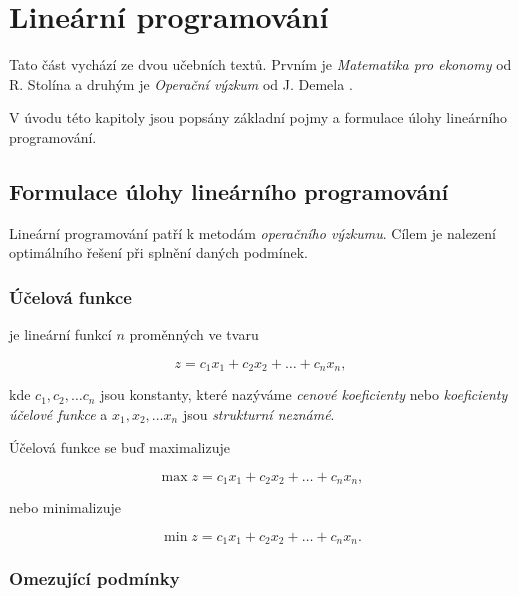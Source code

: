 \section{Lineární programování}
Tato část vychází ze dvou učebních textů. Prvním je \textit{Matematika pro ekonomy} od R. Stolína \cite{matematika_pro_ekonomy} a druhým je \textit{Operační výzkum} od J. Demela \cite{demel}.


V úvodu této kapitoly jsou popsány základní pojmy a formulace úlohy lineárního programování.

\subsection{Formulace úlohy lineárního programování}

Lineární programování patří k metodám \textit{operačního výzkumu}.
Cílem je nalezení optimálního řešení při splnění daných podmínek.

\subsubsection{Účelová funkce}

je lineární funkcí $n$ proměnných ve tvaru

\begin{equation} \label{objective}
    z = c_1x_1 + c_2x_2 + \ldots + c_nx_n ,
\end{equation}


kde $c_1, c_2, \ldots c_n$ jsou konstanty, které nazýváme \textit{cenové koeficienty} nebo \textit{koeficienty účelové funkce} a 
$x_1, x_2, \ldots x_n$ jsou \textit{strukturní neznámé}.

Účelová funkce se buď maximalizuje

\begin{equation} \label{max_objective}
    \max z = c_1x_1 + c_2x_2 + \ldots + c_nx_n ,
\end{equation}

nebo minimalizuje

\begin{equation} \label{min_objective}
    \min z = c_1x_1 + c_2x_2 + \ldots + c_nx_n .
\end{equation}

\subsubsection{Omezující podmínky}

